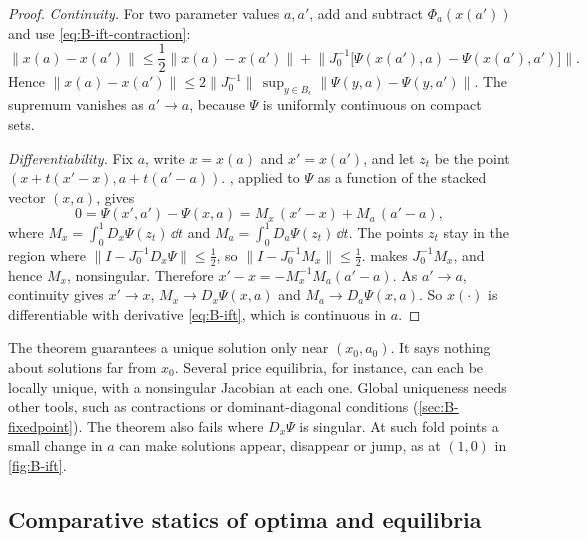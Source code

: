 \begin{proof}
\emph{Continuity.} For two parameter values $a, a'$, add and subtract $\Phi_a(x(a'))$ and use
\eqref{eq:B-ift-contraction}:
\begin{equation*}
\|x(a) - x(a')\| \leq \frac{1}{2}\|x(a) - x(a')\| + \big\|J_0^{-1}\big[\Psi(x(a'), a) - \Psi(x(a'), a')\big]\big\| .
\end{equation*}
Hence $\|x(a) - x(a')\| \leq 2\|J_0^{-1}\|\,\sup_{y \in B_\epsilon}\|\Psi(y, a) - \Psi(y, a')\|$. The supremum vanishes as $a' \to a$,
because $\Psi$ is uniformly continuous on compact sets.

\emph{Differentiability.} Fix $a$, write $x = x(a)$ and $x' = x(a')$, and let $z_t$ be the point
$(x + t(x' - x), a + t(a' - a))$. , applied to $\Psi$ as a function of the stacked vector
$(x, a)$, gives
\begin{equation*}
0 = \Psi(x', a') - \Psi(x, a) = M_x\,(x' - x) + M_a\,(a' - a) ,
\end{equation*}
where $M_x = \int_0^1 D_x\Psi(z_t)\,\dd t$ and $M_a = \int_0^1 D_a\Psi(z_t)\,\dd t$.
The points $z_t$ stay in the region where $\|I - J_0^{-1}D_x\Psi\| \leq \frac{1}{2}$, so
$\|I - J_0^{-1}M_x\| \leq \frac{1}{2}$.  makes $J_0^{-1}M_x$, and hence $M_x$, nonsingular. Therefore
$x' - x = -M_x^{-1}M_a(a' - a)$. As $a' \to a$, continuity gives $x' \to x$, $M_x \to D_x\Psi(x, a)$ and
$M_a \to D_a\Psi(x, a)$. So $x(\cdot)$ is differentiable with derivative \eqref{eq:B-ift}, which is continuous in $a$.
\end{proof}

\begin{remark}\label{rem:B-ift-local}
The theorem guarantees a unique solution only near $(x_0, a_0)$. It says nothing about solutions far from $x_0$.
Several price equilibria, for instance, can each be locally unique, with a nonsingular Jacobian at each one. Global
uniqueness needs other tools, such as contractions or dominant-diagonal conditions (\cref{sec:B-fixedpoint}). The
theorem also fails where $D_x\Psi$ is singular. At such fold points a small change in $a$ can make solutions
appear, disappear or jump, as at $(1, 0)$ in \cref{fig:B-ift}.
\end{remark}

\subsection{Comparative statics of optima and equilibria}\label{sec:B-cs-optimum}

